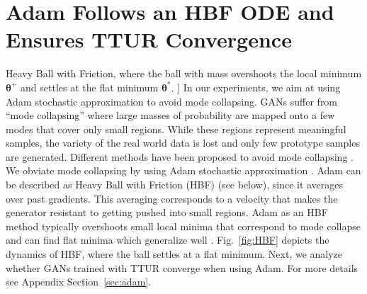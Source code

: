 \documentclass{article}
\newcommand\Bth{\bm{\theta}}
\begin{document}
\section*{Adam Follows an HBF ODE and Ensures TTUR Convergence}
\label{sec:adamhbf}

\begin{figwindow}[3,r,{
\texttt{[image: figures/HBF\_ver2]}
},[Heavy Ball with Friction]{Heavy Ball with Friction,
where the ball with mass overshoots the local minimum $\Bth^+$ and settles at
the flat minimum $\Bth^*$.
  \label{fig:HBF} }]
In our experiments, we aim at using Adam stochastic approximation  to avoid mode
collapsing. GANs suffer from ``mode collapsing'' where large masses of
probability are mapped onto a few modes that cover only small regions.
While these regions represent meaningful samples, the variety of the real world
data is lost and only few prototype samples are generated.
Different methods have been proposed to avoid mode collapsing
\cite{Che:17,Metz:16}. We obviate mode collapsing by using Adam stochastic
approximation \cite{Kingma:14}. Adam can be described as Heavy Ball with
Friction (HBF) (see below), since it averages over past gradients.
This averaging corresponds to a velocity that makes the generator resistant to
getting pushed into small regions. Adam as an HBF method typically overshoots
small local minima that correspond to mode collapse and can find flat minima
which generalize well \cite{Hochreiter:97nc1}. Fig.~\ref{fig:HBF} depicts the
dynamics of HBF, where the ball settles at a flat minimum. Next, we analyze
whether GANs trained with TTUR converge when using Adam. For more details see
Appendix Section~\ref{sec:adam}.
\end{figwindow}
\end{document}
